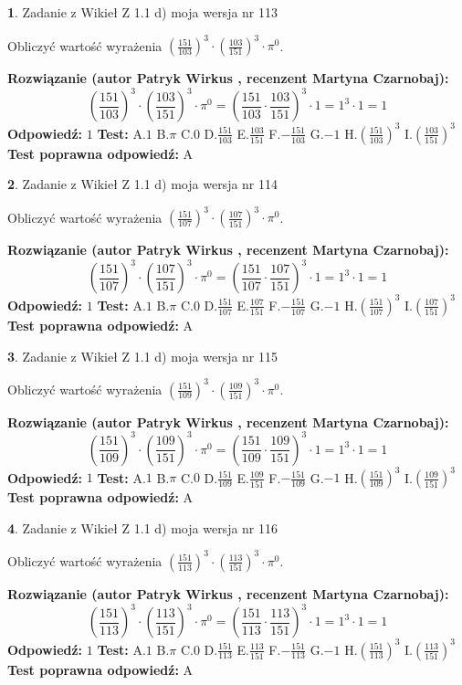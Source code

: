 \documentclass[12pt, a4paper]{article}
\theoremstyle{definition} %
\newtheorem{zad}{}
\newcommand{\zadStart}[1]{\begin{zad}#1\newline}
\newcommand{\zadStop}{\end{zad}}
\newcommand{\rozwStart}[2]{\noindent \textbf{Rozwiązanie (autor #1 , recenzent #2): }\newline}
\newcommand{\rozwStop}{\newline}
\newcommand{\odpStart}{\noindent \textbf{Odpowiedź:}\newline}
\newcommand{\odpStop}{\newline}
\newcommand{\testStart}{\noindent \textbf{Test:}\newline}
\newcommand{\testStop}{\newline}
\newcommand{\kluczStart}{\noindent \textbf{Test poprawna odpowiedź:}\newline}
\newcommand{\kluczStop}{\newline}
\begin{document}
\zadStart{Zadanie z Wikieł Z 1.1 d) moja wersja nr 113}

Obliczyć wartość wyrażenia $(\frac{151}{103})^{3} \cdot (\frac{103}{151})^{3} \cdot \pi^{0}$.
\zadStop
\rozwStart{Patryk Wirkus}{Martyna Czarnobaj}
$$(\frac{151}{103})^{3} \cdot (\frac{103}{151})^{3} \cdot \pi^{0} = (\frac{151}{103} \cdot \frac{103}{151})^{3} \cdot 1 = 1^{3} \cdot 1 = 1$$
\rozwStop
\odpStart
$1$
\odpStop
\testStart
A.$1$ B.$\pi$ C.$0$ D.$\frac{151}{103}$ E.$\frac{103}{151}$
F.$-\frac{151}{103}$ G.$-1$
H.$(\frac{151}{103})^{3}$
I.$(\frac{103}{151})^{3}$
\testStop
\kluczStart
A
\kluczStop



\zadStart{Zadanie z Wikieł Z 1.1 d) moja wersja nr 114}

Obliczyć wartość wyrażenia $(\frac{151}{107})^{3} \cdot (\frac{107}{151})^{3} \cdot \pi^{0}$.
\zadStop
\rozwStart{Patryk Wirkus}{Martyna Czarnobaj}
$$(\frac{151}{107})^{3} \cdot (\frac{107}{151})^{3} \cdot \pi^{0} = (\frac{151}{107} \cdot \frac{107}{151})^{3} \cdot 1 = 1^{3} \cdot 1 = 1$$
\rozwStop
\odpStart
$1$
\odpStop
\testStart
A.$1$ B.$\pi$ C.$0$ D.$\frac{151}{107}$ E.$\frac{107}{151}$
F.$-\frac{151}{107}$ G.$-1$
H.$(\frac{151}{107})^{3}$
I.$(\frac{107}{151})^{3}$
\testStop
\kluczStart
A
\kluczStop



\zadStart{Zadanie z Wikieł Z 1.1 d) moja wersja nr 115}

Obliczyć wartość wyrażenia $(\frac{151}{109})^{3} \cdot (\frac{109}{151})^{3} \cdot \pi^{0}$.
\zadStop
\rozwStart{Patryk Wirkus}{Martyna Czarnobaj}
$$(\frac{151}{109})^{3} \cdot (\frac{109}{151})^{3} \cdot \pi^{0} = (\frac{151}{109} \cdot \frac{109}{151})^{3} \cdot 1 = 1^{3} \cdot 1 = 1$$
\rozwStop
\odpStart
$1$
\odpStop
\testStart
A.$1$ B.$\pi$ C.$0$ D.$\frac{151}{109}$ E.$\frac{109}{151}$
F.$-\frac{151}{109}$ G.$-1$
H.$(\frac{151}{109})^{3}$
I.$(\frac{109}{151})^{3}$
\testStop
\kluczStart
A
\kluczStop



\zadStart{Zadanie z Wikieł Z 1.1 d) moja wersja nr 116}

Obliczyć wartość wyrażenia $(\frac{151}{113})^{3} \cdot (\frac{113}{151})^{3} \cdot \pi^{0}$.
\zadStop
\rozwStart{Patryk Wirkus}{Martyna Czarnobaj}
$$(\frac{151}{113})^{3} \cdot (\frac{113}{151})^{3} \cdot \pi^{0} = (\frac{151}{113} \cdot \frac{113}{151})^{3} \cdot 1 = 1^{3} \cdot 1 = 1$$
\rozwStop
\odpStart
$1$
\odpStop
\testStart
A.$1$ B.$\pi$ C.$0$ D.$\frac{151}{113}$ E.$\frac{113}{151}$
F.$-\frac{151}{113}$ G.$-1$
H.$(\frac{151}{113})^{3}$
I.$(\frac{113}{151})^{3}$
\testStop
\kluczStart
A
\kluczStop
\end{document}
